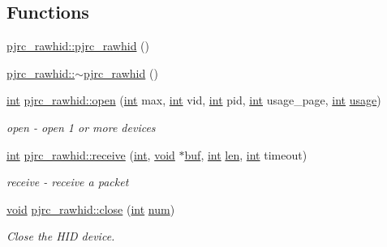 \subsection*{Functions}
\begin{DoxyCompactItemize}
\item 
\hyperlink{group___raw_h_i_d_plugin_gac45cb09ef64b6ae7d47e4d8a3a8ffdbe}{pjrc\-\_\-rawhid\-::pjrc\-\_\-rawhid} ()
\item 
\hyperlink{group___raw_h_i_d_plugin_ga2ddf20ce0f573f8fdaae4134abe0c33f}{pjrc\-\_\-rawhid\-::$\sim$pjrc\-\_\-rawhid} ()
\item 
\hyperlink{ioapi_8h_a787fa3cf048117ba7123753c1e74fcd6}{int} \hyperlink{group___raw_h_i_d_plugin_ga5ec309dd6bff41a84e52450d10db5fa7}{pjrc\-\_\-rawhid\-::open} (\hyperlink{ioapi_8h_a787fa3cf048117ba7123753c1e74fcd6}{int} max, \hyperlink{ioapi_8h_a787fa3cf048117ba7123753c1e74fcd6}{int} vid, \hyperlink{ioapi_8h_a787fa3cf048117ba7123753c1e74fcd6}{int} pid, \hyperlink{ioapi_8h_a787fa3cf048117ba7123753c1e74fcd6}{int} usage\-\_\-page, \hyperlink{ioapi_8h_a787fa3cf048117ba7123753c1e74fcd6}{int} \hyperlink{glext_8h_ae759ed0394ed5353d8bef2fb755305da}{usage})
\begin{DoxyCompactList}\small\item\em open -\/ open 1 or more devices \end{DoxyCompactList}\item 
\hyperlink{ioapi_8h_a787fa3cf048117ba7123753c1e74fcd6}{int} \hyperlink{group___raw_h_i_d_plugin_gad2cd7d0625e39c7743d3bd814c5829d1}{pjrc\-\_\-rawhid\-::receive} (\hyperlink{ioapi_8h_a787fa3cf048117ba7123753c1e74fcd6}{int}, \hyperlink{group___u_a_v_objects_plugin_ga444cf2ff3f0ecbe028adce838d373f5c}{void} $\ast$\hyperlink{ioapi_8h_a8ad8a13c88886b9f623034ff88570adb}{buf}, \hyperlink{ioapi_8h_a787fa3cf048117ba7123753c1e74fcd6}{int} \hyperlink{glext_8h_ac759c9f8b2506530e65879e566e59f02}{len}, \hyperlink{ioapi_8h_a787fa3cf048117ba7123753c1e74fcd6}{int} timeout)
\begin{DoxyCompactList}\small\item\em receive -\/ receive a packet \end{DoxyCompactList}\item 
\hyperlink{group___u_a_v_objects_plugin_ga444cf2ff3f0ecbe028adce838d373f5c}{void} \hyperlink{group___raw_h_i_d_plugin_gaa8ef1b93b6d941b6213a87ccdcd45d91}{pjrc\-\_\-rawhid\-::close} (\hyperlink{ioapi_8h_a787fa3cf048117ba7123753c1e74fcd6}{int} \hyperlink{glext_8h_abb50fc1ead3a02a46fb52daa2045f95c}{num})
\begin{DoxyCompactList}\small\item\em Close the H\-I\-D device. \end{DoxyCompactList}\item 

\end{DoxyCompactItemize}
